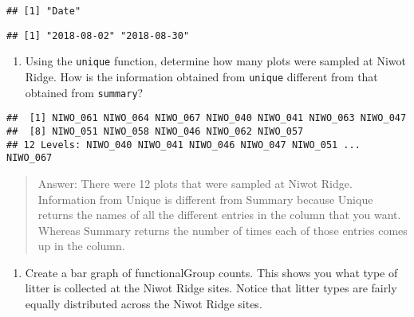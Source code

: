 \documentclass[]{article}
\newenvironment{Shaded}{\begin{snugshade}}{\end{snugshade}}
\newcommand{\CommentTok}[1]{\textcolor[rgb]{0.56,0.35,0.01}{\textit{#1}}}
\newcommand{\DecValTok}[1]{\textcolor[rgb]{0.00,0.00,0.81}{#1}}
\newcommand{\KeywordTok}[1]{\textcolor[rgb]{0.13,0.29,0.53}{\textbf{#1}}}
\newcommand{\NormalTok}[1]{#1}
\newcommand{\OperatorTok}[1]{\textcolor[rgb]{0.81,0.36,0.00}{\textbf{#1}}}
\newcommand{\StringTok}[1]{\textcolor[rgb]{0.31,0.60,0.02}{#1}}
\providecommand{\tightlist}{%
  \setlength{\itemsep}{0pt}\setlength{\parskip}{0pt}}
\begin{document}
\begin{verbatim}
## [1] "Date"
\end{verbatim}

\begin{Shaded}
\end{Shaded}

\begin{verbatim}
## [1] "2018-08-02" "2018-08-30"
\end{verbatim}

\begin{enumerate}
\def\labelenumi{\arabic{enumi}.}
\setcounter{enumi}{12}
\tightlist
\item
  Using the \texttt{unique} function, determine how many plots were
  sampled at Niwot Ridge. How is the information obtained from
  \texttt{unique} different from that obtained from \texttt{summary}?
\end{enumerate}

\begin{Shaded}
\end{Shaded}

\begin{verbatim}
##  [1] NIWO_061 NIWO_064 NIWO_067 NIWO_040 NIWO_041 NIWO_063 NIWO_047
##  [8] NIWO_051 NIWO_058 NIWO_046 NIWO_062 NIWO_057
## 12 Levels: NIWO_040 NIWO_041 NIWO_046 NIWO_047 NIWO_051 ... NIWO_067
\end{verbatim}

\begin{quote}
Answer: There were 12 plots that were sampled at Niwot Ridge.
Information from Unique is different from Summary because Unique returns
the names of all the different entries in the column that you want.
Whereas Summary returns the number of times each of those entries comes
up in the column.
\end{quote}

\begin{enumerate}
\def\labelenumi{\arabic{enumi}.}
\setcounter{enumi}{13}
\tightlist
\item
  Create a bar graph of functionalGroup counts. This shows you what type
  of litter is collected at the Niwot Ridge sites. Notice that litter
  types are fairly equally distributed across the Niwot Ridge sites.
\end{enumerate}
\end{document}
